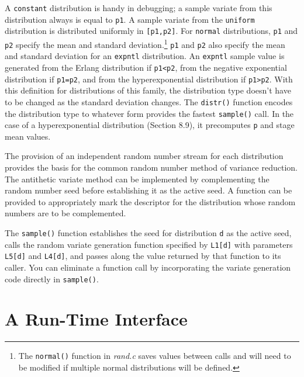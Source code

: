 A \texttt{constant} distribution is handy in debugging; a sample variate from this
distribution always is equal to \texttt{p1}. A sample variate from the \texttt{uniform}
distribution is distributed uniformly in \texttt{[p1,p2]}. For \texttt{normal} distributions,
\texttt{p1} and \texttt{p2} specify the mean and standard deviation.\footnote{The \texttt{normal()} function in \emph{rand.c} saves values between calls and will need to be modified if multiple normal distributions will be defined.}
\texttt{p1} and \texttt{p2} also specify
the mean and standard deviation for an \texttt{expntl} distribution. An \texttt{expntl}
sample value is generated from the Erlang distribution if \texttt{p1<p2}, from the
negative exponential distribution if \texttt{p1=p2}, and from the hyperexponential
distribution if \texttt{p1>p2}. With this definition for distributions of this family,
the distribution type doesn't have to be changed as the standard deviation
changes. The \texttt{distr()} function encodes the distribution type to whatever
form provides the fastest \texttt{sample()} call. In the case of a hyperexponential
distribution (Section 8.9), it precomputes \texttt{p} and stage mean values.

The provision of an independent random number stream for each distribution
provides the basis for the common random number method of variance
reduction. The antithetic variate method can be implemented by complementing
the random number seed before establishing it as the active seed. A
function can be provided to appropriately mark the descriptor for the distribution
whose random numbers are to be complemented.

The \texttt{sample()} function establishes the seed for distribution \texttt{d} as the
active seed, calls the random variate generation function specified by \texttt{L1[d]}
\noindent with parameters \texttt{L5[d]} and \texttt{L4[d]}, and passes along the value returned by
that function to its caller. You can eliminate a function call by incorporating
the variate generation code directly in \texttt{sample()}.

\section{A Run-Time Interface}

